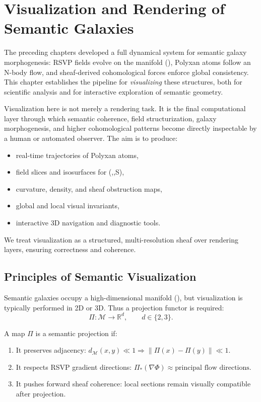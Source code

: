 \chapter{Visualization and Rendering of Semantic Galaxies}
\label{ch:visualization}

The preceding chapters developed a full dynamical system for
semantic galaxy morphogenesis:
RSVP fields evolve on the manifold (),
Polyxan atoms follow an N-body flow,
and sheaf-derived cohomological forces enforce global consistency.
This chapter establishes the pipeline for \emph{visualizing}
these structures, both for scientific analysis and for interactive
exploration of semantic geometry.

Visualization here is not merely a rendering task.
It is the final computational layer through which semantic coherence,
field structurization, galaxy morphogenesis, and higher cohomological
patterns become directly inspectable by a human or automated observer.
The aim is to produce:
\begin{itemize}
\item real-time trajectories of Polyxan atoms,
\item field slices and isosurfaces for (\Phi,,S),
\item curvature, density, and sheaf obstruction maps,
\item global and local visual invariants,
\item interactive 3D navigation and diagnostic tools.
\end{itemize}

We treat visualization as a structured, multi-resolution sheaf over
rendering layers, ensuring correctness and coherence.


\section{Principles of Semantic Visualization}

Semantic galaxies occupy a high-dimensional manifold (),
but visualization is typically performed in 2D or 3D.
Thus a projection functor is required:
\[
  \Pi : \mathcal{M} \longrightarrow \mathbb{R}^d, \qquad d \in \{2,3\}.
\]

\begin{definition}
A map $\Pi$ is a semantic projection if:
\begin{enumerate}
  \item It preserves adjacency: 
        $d_{\mathcal{M}}(x,y) \ll 1 \Rightarrow 
         \|\Pi(x)-\Pi(y)\| \ll 1$.
  \item It respects RSVP gradient directions: 
        $\Pi_*(\nabla\Phi) \approx \text{principal flow directions}$.
  \item It pushes forward sheaf coherence:
        local sections remain visually compatible after projection.
\end{enumerate}
\end{definition}

